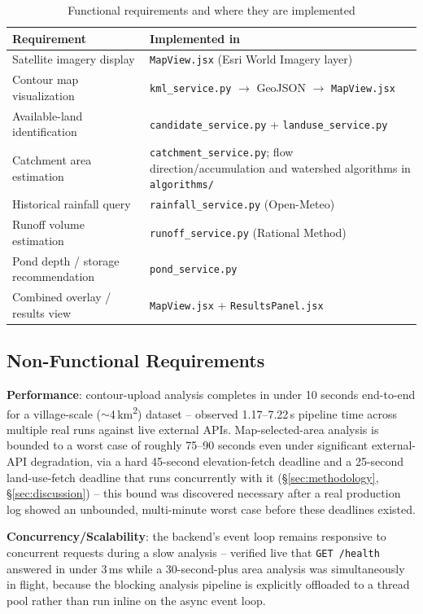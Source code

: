 \documentclass[manuscript,screen]{acmart}
\begin{document}
\begin{table}[h]
  \caption{Functional requirements and where they are implemented}
  \label{tab:requirements}
  \begin{tabular}{p{3.6cm}p{3.6cm}}
    \toprule
    Requirement & Implemented in \\
    \midrule
    Satellite imagery display & \texttt{MapView.jsx} (Esri World Imagery layer) \\
    Contour map visualization & \texttt{kml\_service.py} $\to$ GeoJSON $\to$ \texttt{MapView.jsx} \\
    Available-land identification & \texttt{candidate\_service.py} + \texttt{landuse\_service.py} \\
    Catchment area estimation & \texttt{catchment\_service.py}; flow direction/accumulation and watershed algorithms in \texttt{algorithms/} \\
    Historical rainfall query & \texttt{rainfall\_service.py} (Open-Meteo) \\
    Runoff volume estimation & \texttt{runoff\_service.py} (Rational Method) \\
    Pond depth / storage recommendation & \texttt{pond\_service.py} \\
    Combined overlay / results view & \texttt{MapView.jsx} + \texttt{ResultsPanel.jsx} \\
    \bottomrule
  \end{tabular}
\end{table}

\subsection{Non-Functional Requirements}

\textbf{Performance}: contour-upload analysis completes in under 10
seconds end-to-end for a village-scale ($\sim$4\,km\textsuperscript{2})
dataset -- observed 1.17--7.22\,s pipeline time across multiple real runs
against live external APIs. Map-selected-area analysis is bounded to a
worst case of roughly 75--90 seconds even under significant external-API
degradation, via a hard 45-second elevation-fetch deadline and a
25-second land-use-fetch deadline that runs concurrently with it
(\S\ref{sec:methodology}, \S\ref{sec:discussion}) -- this bound was
discovered necessary after a real production log showed an unbounded,
multi-minute worst case before these deadlines existed.

\textbf{Concurrency/Scalability}: the backend's event loop remains
responsive to concurrent requests during a slow analysis -- verified live
that \texttt{GET /health} answered in under 3\,ms while a 30-second-plus
area analysis was simultaneously in flight, because the blocking analysis
pipeline is explicitly offloaded to a thread pool rather than run inline
on the async event loop.
\end{document}
